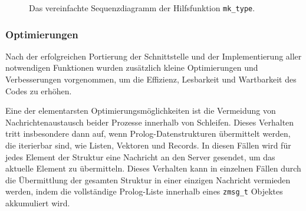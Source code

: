 \begin{figure}[!ht]
  \caption{Das vereinfachte Sequenzdiagramm der Hilfsfunktion \texttt{mk\_type}.}
  \label{fig:mk-type-sequence}
\end{figure}

\subsubsection{Optimierungen}
\label{subsec:optimizations}

Nach der erfolgreichen Portierung der Schnittstelle und der Implementierung aller notwendigen Funktionen
wurden zusätzlich kleine Optimierungen und Verbesserungen vorgenommen, um die Effizienz, Lesbarkeit und Wartbarkeit des Codes zu erhöhen.

Eine der elementarsten Optimierungsmöglichkeiten ist die Vermeidung von Nachrichtenaustausch beider Prozesse
innerhalb von Schleifen. Dieses Verhalten tritt insbesondere dann auf, wenn Prolog-Datenstrukturen übermittelt werden,
die iterierbar sind, wie Listen, Vektoren und Records.
In diesen Fällen wird für jedes Element der Struktur eine Nachricht an den Server gesendet,
um das aktuelle Element zu übermitteln.
Dieses Verhalten kann in einzelnen Fällen durch die Übermittlung der gesamten Struktur in einer einzigen Nachricht vermieden werden,
indem die vollständige Prolog-Liste innerhalb eines \texttt{zmsg\_t} Objektes akkumuliert wird.

